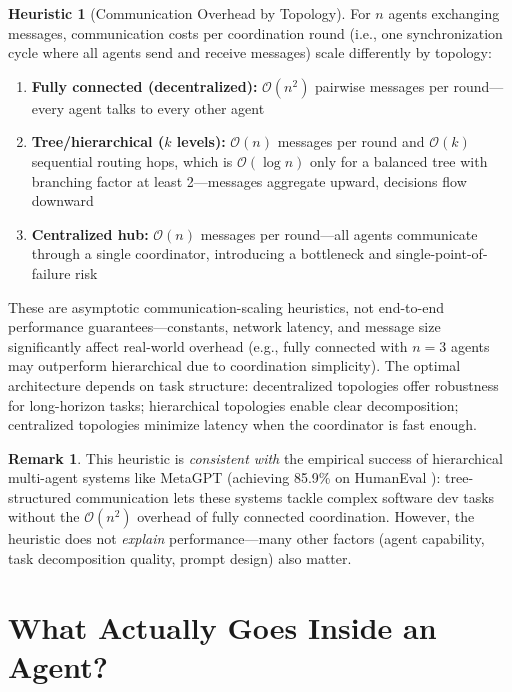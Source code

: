 \documentclass[12pt,a4paper]{report}
\theoremstyle{definition}
\newtheorem{remark}[theorem]{Remark}
\newtheorem{heuristic}[theorem]{Heuristic}
\begin{document}
\begin{heuristic}[Communication Overhead by Topology]
\label{thm:multiagent}
For $n$ agents exchanging messages, communication costs per coordination round (i.e., one synchronization cycle where all agents send and receive messages) scale differently by topology:
\begin{enumerate}
    \item \textbf{Fully connected (decentralized):} $\mathcal{O}(n^2)$ pairwise messages per round---every agent talks to every other agent
    \item \textbf{Tree/hierarchical ($k$ levels):} $\mathcal{O}(n)$ messages per round and $\mathcal{O}(k)$ sequential routing hops, which is $\mathcal{O}(\log n)$ only for a balanced tree with branching factor at least 2---messages aggregate upward, decisions flow downward
    \item \textbf{Centralized hub:} $\mathcal{O}(n)$ messages per round---all agents communicate through a single coordinator, introducing a bottleneck and single-point-of-failure risk
\end{enumerate}
These are asymptotic communication-scaling heuristics, not end-to-end performance guarantees---constants, network latency, and message size significantly affect real-world overhead (e.g., fully connected with $n=3$ agents may outperform hierarchical due to coordination simplicity). The optimal architecture depends on task structure: decentralized topologies offer robustness for long-horizon tasks; hierarchical topologies enable clear decomposition; centralized topologies minimize latency when the coordinator is fast enough.
\end{heuristic}

\begin{remark}
This heuristic is \emph{consistent with} the empirical success of hierarchical multi-agent systems like MetaGPT (achieving 85.9\% on HumanEval \cite{hong2023metagpt}): tree-structured communication lets these systems tackle complex software dev tasks without the $\mathcal{O}(n^2)$ overhead of fully connected coordination. However, the heuristic does not \emph{explain} performance---many other factors (agent capability, task decomposition quality, prompt design) also matter.
\end{remark}

\section{What Actually Goes Inside an Agent?}
\label{sec:architectures}
\end{document}
